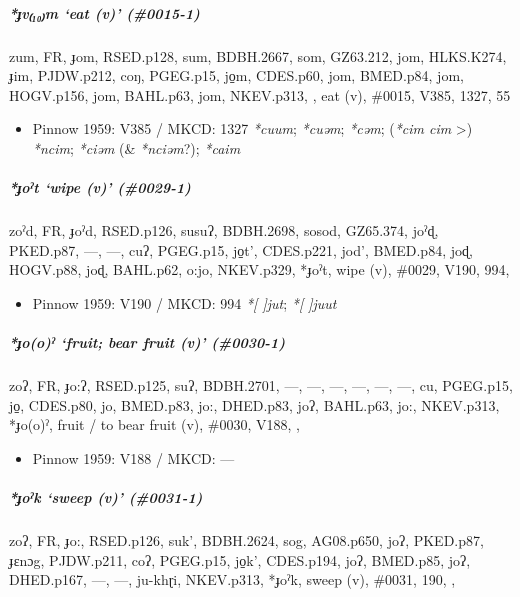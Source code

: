 \documentclass[a4paper,]{article}
\providecommand{\tightlist}{%
  \setlength{\itemsep}{0pt}\setlength{\parskip}{0pt}}
\let\oldsubparagraph\subparagraph
\renewcommand{\subparagraph}[1]{\oldsubparagraph{#1}\mbox{}}
\begin{document}
\subparagraph{\texorpdfstring{\emph{*ɟv₍₁₀₎m} `eat (v)'
(\#0015-1)}{*ɟv₍₁₀₎m eat (v) (\#0015-1)}}\label{ux25fvm-eat-v-0015-1}

zum, FR, ɟom, RSED.p128, sum, BDBH.2667, som, GZ63.212, jom, HLKS.K274,
ɟim, PJDW.p212, coŋ, PGEG.p15, jo̠m, CDES.p60, jom, BMED.p84, jom,
HOGV.p156, jom, BAHL.p63, jom, NKEV.p313, , eat (v), \#0015, V385, 1327,
55

\begin{itemize}
\tightlist
\item
  Pinnow 1959: V385 / MKCD: 1327 \emph{*cuum}; \emph{*cuəm};
  \emph{*cəm}; (\emph{*cim cim} \textgreater{}) \emph{*ncim};
  \emph{*ciəm} (\& \emph{*nciəm}?); \emph{*caim}
\end{itemize}

\subparagraph{\texorpdfstring{\emph{*ɟoˀt} `wipe (v)'
(\#0029-1)}{*ɟoˀt wipe (v) (\#0029-1)}}\label{ux25foux2c0t-wipe-v-0029-1}

zoˀd, FR, ɟoˀd, RSED.p126, susuʔ, BDBH.2698, sosod, GZ65.374, joˀɖ,
PKED.p87, ---, ---, cuʔ, PGEG.p15, jo̠t', CDES.p221, jod', BMED.p84, joɖ,
HOGV.p88, joɖ, BAHL.p62, o:jo, NKEV.p329, *ɟoˀt, wipe (v), \#0029, V190,
994,

\begin{itemize}
\tightlist
\item
  Pinnow 1959: V190 / MKCD: 994 \emph{*{[} {]}jut}; \emph{*{[} {]}juut}
\end{itemize}

\subparagraph{\texorpdfstring{\emph{*ɟo(o)ˀ} `fruit; bear fruit (v)'
(\#0030-1)}{*ɟo(o)ˀ fruit; bear fruit (v) (\#0030-1)}}\label{ux25fooux2c0-fruit-bear-fruit-v-0030-1}

zoʔ, FR, ɟo:ʔ, RSED.p125, suʔ, BDBH.2701, ---, ---, ---, ---, ---, ---,
cu, PGEG.p15, jo̠, CDES.p80, jo, BMED.p83, jo:, DHED.p83, joʔ, BAHL.p63,
jo:, NKEV.p313, *ɟo(o)ˀ, fruit / to bear fruit (v), \#0030, V188, ,

\begin{itemize}
\tightlist
\item
  Pinnow 1959: V188 / MKCD: ---
\end{itemize}

\subparagraph{\texorpdfstring{\emph{*ɟoˀk} `sweep (v)'
(\#0031-1)}{*ɟoˀk sweep (v) (\#0031-1)}}\label{ux25foux2c0k-sweep-v-0031-1}

zoʔ, FR, ɟo:, RSED.p126, suk', BDBH.2624, sog, AG08.p650, joʔ, PKED.p87,
ɟɛnɔg, PJDW.p211, coʔ, PGEG.p15, jo̠k', CDES.p194, joʔ, BMED.p85, joʔ,
DHED.p167, ---, ---, ju-khɽi, NKEV.p313, *ɟoˀk, sweep (v), \#0031, 190,
,
\end{document}

